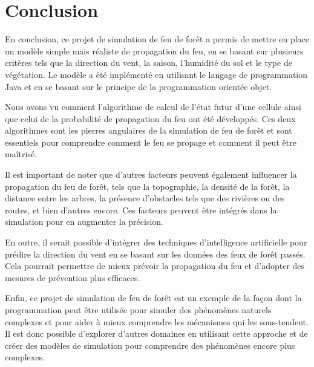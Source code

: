 {}
\section*{Conclusion}

En conclusion, ce projet de simulation de feu de forêt a permis de mettre en place un modèle simple mais réaliste de propagation du feu, en se basant sur plusieurs critères tels que la direction du vent, la saison, l'humidité du sol et le type de végétation. Le modèle a été implémenté en utilisant le langage de programmation Java et en se basant sur le principe de la programmation orientée objet. 

Nous avons vu comment l'algorithme de calcul de l'état futur d'une cellule ainsi que celui de la probabilité de propagation du feu ont été développés. Ces deux algorithmes sont les pierres angulaires de la simulation de feu de forêt et sont essentiels pour comprendre comment le feu se propage et comment il peut être maîtrisé. 

Il est important de noter que d'autres facteurs peuvent également influencer la propagation du feu de forêt, tels que la topographie, la densité de la forêt, la distance entre les arbres, la présence d'obstacles tels que des rivières ou des routes, et bien d'autres encore. Ces facteurs peuvent être intégrés dans la simulation pour en augmenter la précision. 

En outre, il serait possible d'intégrer des techniques d'intelligence artificielle pour prédire la direction du vent en se basant sur les données des feux de forêt passés. Cela pourrait permettre de mieux prévoir la propagation du feu et d'adopter des mesures de prévention plus efficaces. 

Enfin, ce projet de simulation de feu de forêt est un exemple de la façon dont la programmation peut être utilisée pour simuler des phénomènes naturels complexes et pour aider à mieux comprendre les mécanismes qui les sous-tendent. Il est donc possible d'explorer d'autres domaines en utilisant cette approche et de créer des modèles de simulation pour comprendre des phénomènes encore plus complexes.
